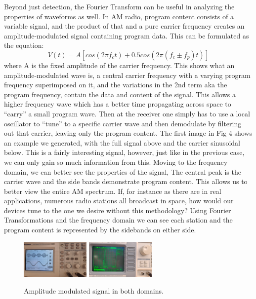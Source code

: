 \documentclass[prl,twocolumn,superscriptaddress,floatfix]{revtex4}
\begin{document}
Beyond just detection, the Fourier Transform can be useful in analyzing the properties of waveforms as well.
In AM radio, program content consists of a variable signal, and the product of that and a pure carrier frequency creates an amplitude-modulated signal containing program data.
This can be formulated as the equation:
\begin{equation}
    V(t) = A[cos(2\pi f_{c}t)+0.5cos(2\pi(f_{c} \pm f_{p})t)]
\end{equation}
where A is the fixed amplitude of the carrier frequency.
This shows what an amplitude-modulated wave is, a central carrier frequency with a varying program frequency superimposed on it, and the variations in the 2nd term aka the program frequency, contain the data and content of the signal.
This allows a higher frequency wave which has a better time propagating across space to ``carry'' a small program wave.
Then at the receiver one simply has to use a local oscillator to ``tune'' to a specific carrier wave and then demodulate by filtering out that carrier, leaving only the program content.
The first image in Fig 4 shows an example we generated, with the full signal above and the carrier sinusoidal below.
This is a fairly interesting signal, however, just like in the previous case, we can only gain so much information from this.
Moving to the frequency domain, we can better see the properties of the signal, The central peak is the carrier wave and the side bands demonstrate program content.
This allows us to better view the entire AM spectrum. If, for instance as there are in real applications, numerous radio stations all broadcast in space, how would our devices tune to the one we desire without this methodology?
Using Fourier Transformations and the frequency domain we can see each station and the program content is represented by the sidebands on either side. 

\begin{figure}[H]
\begin{center}
\includegraphics[width = 0.3\textwidth]{AM data, Time.jpg}
\includegraphics[width = 0.3\textwidth]{AM data, Freq.jpg}
\label{amsignal}
\caption{Amplitude modulated signal in both domains.}
\end{center}
\end{figure}
\end{document}
